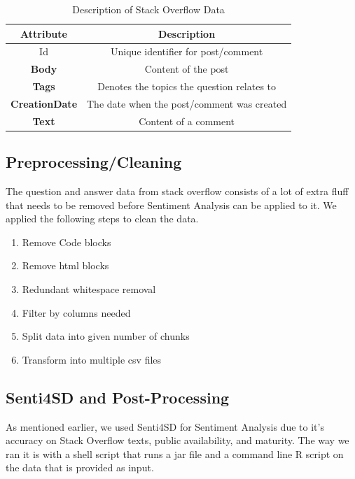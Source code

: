 \documentclass[conference]{IEEEtran}
\begin{document}
\begin{table}[htbp]
\caption{Description of Stack Overflow Data}
\begin{center}
\begin{tabular}{|c|c|}
\hline
\textbf{Attribute}&\textbf{Description}\\
\hline
Id&Unique identifier for post/comment\\
\hline
\textbf{Body}&Content of the post\\
\hline
\textbf{Tags}&Denotes the topics the question relates to\\
\hline
\textbf{CreationDate}&The date when the post/comment was created\\
\hline
\textbf{Text}&Content of a comment\\
\hline
\end{tabular}
\label{tab1}
\end{center}
\end{table}

\subsection{Preprocessing/Cleaning}
The question and answer data from stack overflow consists of a lot of extra fluff that needs to be removed before Sentiment Analysis can be applied to it. We applied the following steps to clean the data.

\begin{enumerate}
    \item Remove Code blocks
    \item Remove html blocks
    \item Redundant whitespace removal
    \item Filter by columns needed
    \item Split data into given number of chunks
    \item Transform into multiple csv files\\
\end{enumerate}

\subsection{Senti4SD and Post-Processing}
As mentioned earlier, we used Senti4SD for Sentiment Analysis due to it's accuracy on Stack Overflow texts, public availability, and maturity. The way we ran it is with a shell script that runs a jar file and a command line R script on the data that is provided as input.\\
\end{document}
